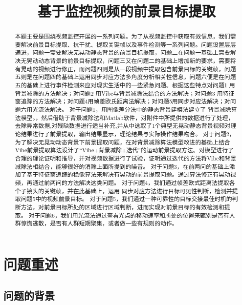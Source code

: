 \documentclass[bwprint]{gmcmthesis}
\title{基于监控视频的前景目标提取}
\begin{document}
 \maketitle
 \begin{abstract}
 本题主要是围绕视频监控开展的一系列问题。为了从视频监控中获取有效信息，我们需要解决前景目标提取、抗干扰、提取关键帧以及事件检测等一系列问题。问题设置层层递进，问题一需要解决无晃动静态背景的前景目标提取，问题二在问题一基础上需要解决无晃动动态背景的前景目标提取，问题三又在问题二的基础上增加新的要求，需要将有晃动的视频进行修正，而问题四则是从一段视频中提取包含前景目标的关键帧，问题五则是在问题四的基础上运用同步对应方法多角度分析相关性信息，问题六便是在问题五的基础上进行事件检测来应对现实生活中的一些紧急问题。根据这些特点对问题1 用背景减除的方法解决；对问题2 用Vibe与背景减除法结合的方法解决；对问题3 用特征窗追踪的方法解决；对问题4用帧差欧氏距离法解决；对问题5用同步对应法解决；对问题六用光流法解决。
对于问题1，用图像差分法中的静态背景建模法建立了 背景减除算法模型。，然后借助于背景减除法和Matlab软件，对附件中所提供的数据进行了处理，去除异常数据,对残缺数据进行适当补充,并从中选取了1个典型无晃动静态背景视频对理论结果进行了前景提取，输出结果显示，理论结果与实际操作结果吻合。
对于问题2，为了解决无晃动动态背景下前景提取问题，在对背景减除算法模型改进的基础上结合Vibe前景提取算法设计了“Vibe+背景减除+迭代”的运动前景提取方法。对模型进行了合理的理论证明和推导，并对视频数据进行了试验，证明通过迭代的方法将Vibe和背景减除法相结合，能够很好的消除上面所提到的噪音。
对于问题3，在前两问的基础上添加了基于特征窗追踪的稳像算法来解决有晃动的前景提取问题。通过算法修正有晃动视频，再通过前两问的方法解决这类问题。
对于问题4，我们通过帧差欧式距离法提取各个子镜头的关键帧，并在此基础上，运用 同步对应方法进行目标可见性判断，检测并提取问题5中的视频前景目标。
对于问题5，我们通过一种可靠性的目标交接最佳时机的判断方法，对前景目标所处的区域进行区域判断，进而实现对前景目标的有效检测和提取。
对于问题6，我们用光流法通过查看光点的移动速率和所处的位置来甄别是否有人群惊慌逃散，是否有人群短期聚集，或者做一些有规则的动作。 
 


\end{abstract}

\pagestyle{plain}
\section{问题重述}

\subsection{问题的背景}
\end{document}
